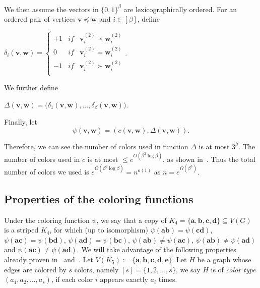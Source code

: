 \documentclass[11pt]{article}
\theoremstyle{definition}
\newcommand{\aaa}{\boldsymbol{a}}
\newcommand{\bb}{\boldsymbol{b}}
\newcommand{\cc}{\boldsymbol{c}}
\newcommand{\dd}{\boldsymbol{d}}
\newcommand{\ee}{\boldsymbol{e}}
\begin{document}
We then assume the vectors in $\{0,1\}^{\beta}$ are lexicographically ordered. For an ordered pair of vertices $\boldsymbol{v}\preceq \boldsymbol{w}$ and $i\in[\beta]$, define
\begin{center}
    $\delta_{i}(\boldsymbol{v},\boldsymbol{w})=\left\{\begin{matrix}
 +1&if &\boldsymbol{v}_{i}^{(2)}\prec \boldsymbol{w}_{i}^{(2)} \\
 0&if&\boldsymbol{v}_{i}^{(2)} = \boldsymbol{w}_{i}^{(2)} \\
 -1& if &\boldsymbol{v}_{i}^{(2)}\succ\boldsymbol{w}_{i}^{(2)} \\
\end{matrix}\right.$.
\end{center}

We further define
\begin{center}
    $\Delta(\boldsymbol{v},\boldsymbol{w})=\big(\delta_{1}(\boldsymbol{v},\boldsymbol{w}),\ldots,\delta_{\beta}(\boldsymbol{v},\boldsymbol{w})\big)$.
\end{center}

Finally, let
\begin{equation*}
   \psi(\boldsymbol{v},\boldsymbol{w})=(c(\boldsymbol{v},\boldsymbol{w}),\Delta(\boldsymbol{v},\boldsymbol{w})). 
\end{equation*}

Therefore, we can see the number of colors used in function $\Delta$ is at most $3^{\beta}$. The number of colors used in $c$ is at most $\le e^{O(\beta^{2}\log{\beta})}$, as shown in~\cite{2015PLMSCFLS}. Thus the total number of colors we used is $e^{O(\beta^{2}\log{\beta})}=n^{o(1)}$ as $n=e^{\Omega(\beta^{3})}$.


\subsection{Properties of the coloring functions}




Under the coloring function $\psi$, we say that a copy of $K_{4}=\{\aaa,\bb,\cc,\dd\}\subseteq V(G)$ is a striped $K_{4}$, for which (up to isomorphism) $\psi(\aaa\bb)=\psi(\cc\dd)$, $\psi(\aaa\cc)=\psi(\bb\dd)$, $\psi(\aaa\dd)=\psi(\bb\cc)$, $\psi(\aaa\bb)\neq \psi(\aaa\cc)$, $\psi(\aaa\bb)\neq \psi(\aaa\dd)$ and $\psi(\aaa\cc)\neq \psi(\aaa\dd)$.
We will take advantage of the following properties already proven in~\cite{2018CPC55} and~\cite{2023CPC6688}. Let $V(K_{5}):=\{\aaa,\bb,\cc,\dd,\ee\}$. Let $H$ be a graph whose edges are colored by $s$ colors, namely $[s]=\{1,2,\ldots,s\}$, we say $H$ is of \emph{color type} $(a_{1},a_{2},\ldots,a_{s})$, if each color $i$ appears exactly $a_{i}$ times.
\end{document}

